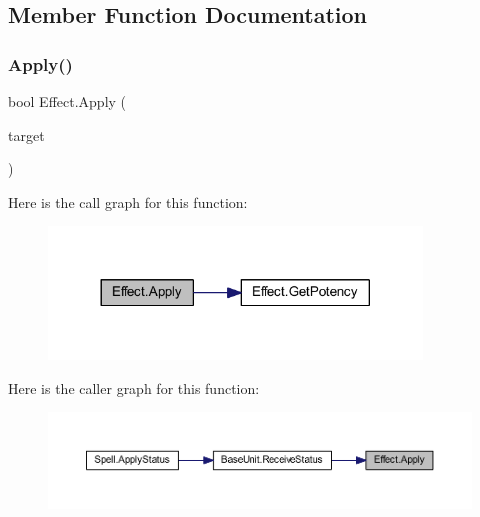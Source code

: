 \subsection{Member Function Documentation}
\mbox{\label{class_effect_a81689f18a4d3ae57ca39b71592be76ef}} 
\subsubsection{\texorpdfstring{Apply()}{Apply()}}
{\footnotesize\ttfamily bool Effect.\+Apply (\begin{DoxyParamCaption}\item[{\mbox{\hyperlink{class_base_unit}{Base\+Unit}}}]{target }\end{DoxyParamCaption})}

Here is the call graph for this function\+:
\nopagebreak
\begin{figure}[H]
\begin{center}
\leavevmode
\includegraphics[width=281pt]{class_effect_a81689f18a4d3ae57ca39b71592be76ef_cgraph}
\end{center}
\end{figure}
Here is the caller graph for this function\+:
\nopagebreak
\begin{figure}[H]
\begin{center}
\leavevmode
\includegraphics[width=350pt]{class_effect_a81689f18a4d3ae57ca39b71592be76ef_icgraph}
\end{center}
\end{figure}
\mbox{\label{class_effect_a5af13ce8f65df2bfbba422a46e627fc0}} 
